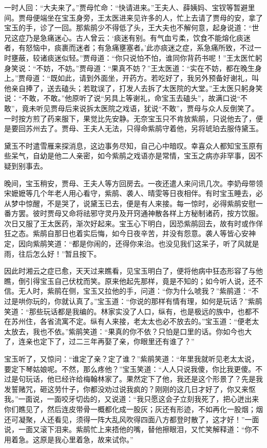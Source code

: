 \documentclass[12pt,oneside]{book}
\begin{document}
一时人回：“大夫来了。”贾母忙命：“快请进来。”王夫人、薛姨妈、宝钗等暂避里间。贾母便端坐在宝玉身旁，王太医进来见许多的人，忙上去请了贾母的安，拿了宝玉的手，诊了一回。那紫鹃少不得低了头，王大夫也不解何意，起身说道：“世兄这症乃是急痛迷心。古人曾云：‘痰迷有别。有气血亏柔，饮食不能熔化痰迷者，有怒恼中，痰裹而迷者；有急痛壅塞者。’此亦痰迷之症，系急痛所致，不过一时壅蔽，较诸痰迷似轻。”贾母道：“你只说怕不怕，谁同你背药书呢！”王太医忙躬身笑说：“不妨，不妨。”贾母道：“果真不妨？”王太医道：“实在不妨，都在晚生身上。”贾母道：“既如此，请到外面坐，开药方。若吃好了，我另外预备好谢礼，叫他亲自捧了，送去磕头；若耽误了，打发人去拆了太医院的大堂。”王太医只躬身笑说：“不敢，不敢。”他原听了说“另具上等谢礼，命宝玉去磕头”，故满口说“不敢”，竟未听见贾母后来说拆太医院之戏语，犹说“不敢”，贾母与众人反倒笑了。一时按方煎了药来服下，果觉比先安静。无奈宝玉只不肯放紫鹃，只说他去了，便是要回苏州去了。贾母、王夫人无法，只得命紫鹃守着他，另将琥珀去服侍黛玉。

黛玉不时遣雪雁来探消息，这边事务尽知，自己心中暗叹。幸喜众人都知宝玉原有些呆气，自幼是他二人亲密，如今紫鹃之戏语亦是常情，宝玉之病亦非罕事，因不疑到别事去。

晚间，宝玉稍安，贾母、王夫人等方回房去。一夜还遣人来问讯几次。李奶母带领宋嬷嬷等几个年老人用心看守，紫鹃、袭人、晴雯等日夜相伴。有时宝玉睡去，必从梦中惊醒，不是哭了，说黛玉已去，便是有人来接。每一惊时，必得紫鹃安慰一番方罢。彼时贾母又命将祛邪守灵丹及开窍通神散各样上方秘制诸药，按方饮服。次日又服了王太医药，渐次好起来。宝玉心下明白，因恐紫鹃回去，故有时或作佯狂之态。紫鹃自那日也着实后悔，如今日夜辛苦，并没有怨意。袭人等皆心安神定，因向紫鹃笑道：“都是你闹的，还得你来治。也没见我们这呆子，听了风就是雨，往后怎么好！”暂且按下。

因此时湘云之症已愈，天天过来瞧看，见宝玉明白了，便将他病中狂态形容了与他瞧，倒引得宝玉自己伏枕而笑。原来他起先那样，竟是不知的；如今听人说，还不信。无人时，紫鹃在侧，宝玉又拉他的手，问道：“你为什么唬我？”紫鹃道：“不过是哄你玩的，你就认真了。”宝玉道：“你说的那样有情有理，如何是玩话？”紫鹃笑道：“那些玩话都是我编的。林家实没了人口，纵有，也是极远的族中，也都不在苏州住，各省流寓不定。纵有人来接，老太太也必不放去的。”宝玉道：“便老太太放去，我也不依。”紫鹃笑道：“果真的你不依？只怕是口里的话。你如今也大了，连亲也定下了，过二三年再娶了亲，你眼里还有谁了？”

宝玉听了，又惊问：“谁定了亲？定了谁？”紫鹃笑道：“年里我就听见老太太说，要定下琴姑娘呢。不然，那么疼他？”宝玉笑道：“人人只说我傻，你比我更傻。不过是句玩话，他已经许给梅翰林家了。果然定下了他，我还是这个形景了？先是我发誓赌咒，砸这劳什子，你都没劝过说我疯的？刚刚的这几日才好了，你又来怄我。”一面说，一面咬牙切齿的，又说道：“我只愿这会子立刻我死了，把心迸出来你们瞧见了，然后连皮带骨一概都化成一股灰；灰还有形迹，不如再化一股烟；烟还可凝聚，人还看见，须得一阵大乱风吹得四面八方都登时散了，这才好！”一面说，一面又滚下泪来。紫鹃忙上来捂他的嘴，替他擦眼泪，又忙笑解释道：“你不用着急。这原是我心里着急，故来试你。”
\end{document}
